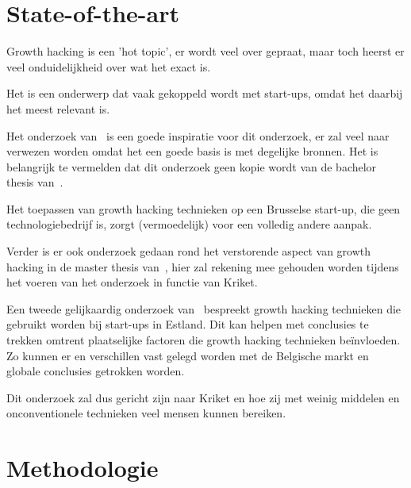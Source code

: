 \section{State-of-the-art}
\label{sec:state-of-the-art}

Growth hacking is een 'hot topic', er wordt veel over gepraat, maar toch heerst er veel onduidelijkheid over wat het exact is. 

Het is een onderwerp dat vaak gekoppeld wordt met start-ups, omdat het daarbij het meest relevant is. 

Het onderzoek van~\textcite{Lee2016} is een goede inspiratie voor dit onderzoek, er zal veel naar verwezen worden omdat het een goede basis is met degelijke bronnen. Het is belangrijk te vermelden dat dit onderzoek geen kopie wordt van de bachelor thesis van~\textcite{Lee2016}. 

Het toepassen van growth hacking technieken op een Brusselse start-up, die geen technologiebedrijf is, zorgt (vermoedelijk) voor een volledig andere aanpak. 

Verder is er ook onderzoek gedaan rond het verstorende aspect van growth hacking in de master thesis van~\textcite{Bergendal2017}, hier zal rekening mee gehouden worden tijdens het voeren van het onderzoek in functie van Kriket.

Een tweede gelijkaardig onderzoek van~\textcite{Vunk2017} bespreekt growth hacking technieken die gebruikt worden bij start-ups in Estland. Dit kan helpen met conclusies te trekken omtrent plaatselijke factoren die growth hacking technieken beïnvloeden. Zo kunnen er en verschillen vast gelegd worden met de Belgische markt en globale conclusies getrokken worden.

Dit onderzoek zal dus gericht zijn naar Kriket en hoe zij met weinig middelen en onconventionele technieken veel mensen kunnen bereiken.



\section{Methodologie}
\label{sec:methodologie}


